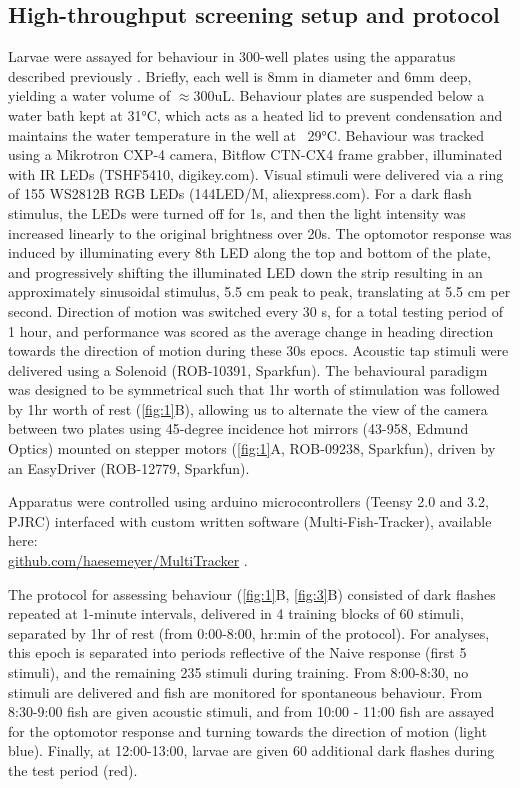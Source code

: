 \documentclass[9pt,lineno]{RandlettLab_elife}
\begin{document}
\subsection{High-throughput screening setup and protocol}

Larvae were assayed for behaviour in 300-well plates using the apparatus described previously \citep{Randlett2019-fi}. Briefly, each well is 8mm in diameter and 6mm deep, yielding a water volume of $\approx$300uL. Behaviour plates are suspended below a water bath kept at 31°C, which acts as a heated lid to prevent condensation and maintains the water temperature in the well at ~29°C. Behaviour was tracked using a Mikrotron CXP-4 camera, Bitflow CTN-CX4 frame grabber, illuminated with IR LEDs (TSHF5410, digikey.com).  Visual stimuli were delivered via a ring of 155 WS2812B RGB LEDs (144LED/M, aliexpress.com). For a dark flash stimulus, the LEDs were turned off for 1s, and then the light intensity was increased linearly to the original brightness over 20s. The optomotor response was induced by illuminating every 8th LED along the top and bottom of the plate, and progressively shifting the illuminated LED down the strip resulting in an approximately sinusoidal stimulus, 5.5 cm peak to peak, translating at 5.5 cm per second. Direction of motion was switched every 30 s, for a total testing period of 1 hour, and performance was scored as the average change in heading direction towards the direction of motion during these 30s epocs. Acoustic tap stimuli were delivered using a Solenoid (ROB-10391, Sparkfun). The behavioural paradigm was designed to be symmetrical such that 1hr worth of stimulation was followed by 1hr worth of rest (\autoref{fig:1}B), allowing us to alternate the view of the camera between two plates using 45-degree incidence hot mirrors (43-958, Edmund Optics) mounted on stepper motors (\autoref{fig:1}A, ROB-09238, Sparkfun), driven by an EasyDriver (ROB-12779, Sparkfun). 

Apparatus were controlled using arduino microcontrollers (Teensy 2.0 and 3.2, PJRC) interfaced with custom written software (Multi-Fish-Tracker), available here: \\
\href{https://github.com/haesemeyer/MultiTracker}{github.com/haesemeyer/MultiTracker} . 

The protocol for assessing behaviour (\autoref{fig:1}B, \autoref{fig:3}B) consisted of dark flashes repeated at 1-minute intervals, delivered in 4 training blocks of 60 stimuli, separated by 1hr of rest (from 0:00-8:00, hr:min of the protocol). For analyses, this epoch is separated into periods reflective of the Naive response (first 5 stimuli), and the remaining 235 stimuli during training. From 8:00-8:30, no stimuli are delivered and fish are monitored for spontaneous behaviour. From 8:30-9:00 fish are given acoustic stimuli, and from 10:00 - 11:00 fish are assayed for the optomotor response and turning towards the direction of motion (light blue). Finally, at 12:00-13:00, larvae are given 60 additional dark flashes during the test period (red). 
\end{document}
